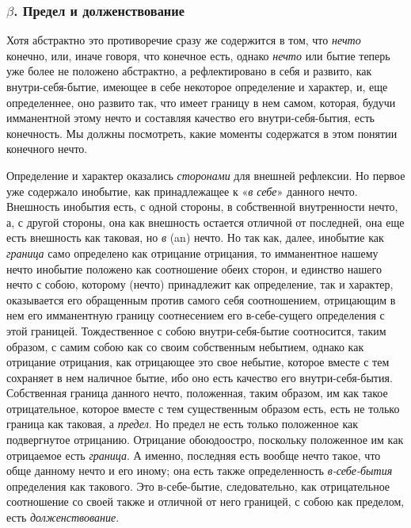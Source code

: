 \bigskip

\subsubsection[$\beta $. Предел и долженствование]{$\beta $. Предел и долженствование}

Хотя абстрактно это противоречие сразу же содержится в том, что
{\em нечто} конечно, или, иначе говоря, что конечное
есть, однако {\em нечто} или бытие теперь уже более не
положено абстрактно, а рефлектировано в себя и развито, как
внутри-себя-бытие, имеющее в себе некоторое определение и характер, и, еще
определеннее, оно развито так, что имеет границу в нем самом, которая,
будучи имманентной этому нечто и составляя качество его внутри-себя-бытия,
есть конечность. Мы должны посмотреть, какие моменты содержатся в этом
понятии конечного нечто.

Определение и характер оказались {\em сторонами} для
внешней рефлексии. Но первое уже содержало инобытие, как принадлежащее к
«{\em в себе}» данного нечто. Внешность инобытия есть,
с одной стороны, в собственной внутренности нечто, а, с другой стороны, она
как внешность остается отличной от последней, она еще есть внешность как
таковая, но {\em в} (an) нечто. Но так как, далее,
инобытие как {\em граница} само определено как
отрицание отрицания, то имманентное нашему нечто инобытие положено как
соотношение обеих сторон, и единство нашего нечто с собою, которому (нечто)
принадлежит как определение, так и характер, оказывается его обращенным
против самого себя соотношением, отрицающим в нем его имманентную границу
соотнесением его в-себе-сущего определения с этой границей. Тождественное с
собою внутри-себя-бытие соотносится, таким образом, с самим собою как со
своим собственным небытием, однако как отрицание отрицания, как отрицающее
это свое небытие, которое вместе с тем сохраняет в нем наличное бытие, ибо
оно есть качество его внутри-себя-бытия. Собственная граница данного нечто,
положенная, таким образом, им как такое отрицательное, которое вместе с тем
существенным образом есть, есть не только граница как таковая, а
{\em предел}. Но предел не есть только положенное как
подвергнутое отрицанию. Отрицание обоюдоостро, поскольку положенное им как
отрицаемое есть {\em граница}. А именно, последняя есть
вообще нечто такое, что обще данному нечто и его иному; она есть также
определенность {\em в-себе-бытия} определения как
такового. Это в-себе-бытие, следовательно, как отрицательное соотношение со
своей также и отличной от него границей, с собою как пределом, есть
{\em долженствование}.

